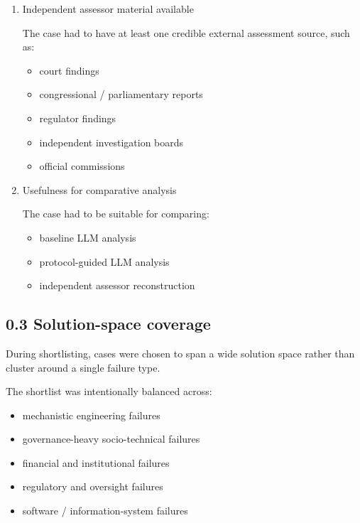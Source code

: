 {\begin{enumerate}
There had to be enough public information to describe the system, organizational structure, and task intent without relying on the final investigation findings.

\item Independent assessor material available

The case had to have at least one credible external assessment source, such as:

\begin{itemize}
\item court findings
\item congressional / parliamentary reports
\item regulator findings
\item independent investigation boards
\item official commissions
\end{itemize}

\item Usefulness for comparative analysis

The case had to be suitable for comparing:

\begin{itemize}
\item baseline LLM analysis
\item protocol-guided LLM analysis
\item independent assessor reconstruction
\end{itemize}

\end{enumerate}

\subsection*{0.3 Solution-space coverage}

During shortlisting, cases were chosen to span a wide solution space rather than cluster around a single failure type.

The shortlist was intentionally balanced across:

\begin{itemize}
\item mechanistic engineering failures
\item governance-heavy socio-technical failures
\item financial and institutional failures
\item regulatory and oversight failures
\item software / information-system failures
\end{itemize}

}
